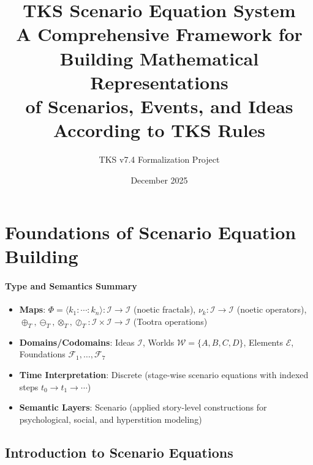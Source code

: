 \documentclass[11pt,twoside]{book}
\newcommand{\noe}[1]{\nu_{#1}}
\newcommand{\Ideas}{\mathcal{I}}
\newcommand{\Worlds}{\mathcal{W}}
\newcommand{\Elements}{\mathcal{E}}
\newcommand{\Foundations}{\mathcal{F}}
\newcommand{\Frac}{\Phi}
\newcommand{\Tadd}{\oplus_T}
\newcommand{\Tsub}{\ominus_T}
\newcommand{\Tmul}{\otimes_T}
\newcommand{\Tdiv}{\oslash_T}
\begin{document}
\title{\textbf{TKS Scenario Equation System} \\[0.5em]
\Large A Comprehensive Framework for Building Mathematical Representations \\
of Scenarios, Events, and Ideas According to TKS Rules}
\author{TKS v7.4 Formalization Project}
\date{December 2025}
\maketitle

\tableofcontents

\part{Foundations of Scenario Equation Building}

\subsection*{Type and Semantics Summary}
\begin{itemize}
    \item \textbf{Maps}: $\Frac = \langle k_1 : \cdots : k_n \rangle : \Ideas \to \Ideas$ (noetic fractals), $\noe{k} : \Ideas \to \Ideas$ (noetic operators), $\Tadd, \Tsub, \Tmul, \Tdiv : \Ideas \times \Ideas \to \Ideas$ (Tootra operations)
    \item \textbf{Domains/Codomains}: Ideas $\Ideas$, Worlds $\Worlds = \{A, B, C, D\}$, Elements $\Elements$, Foundations $\Foundations_1, \ldots, \Foundations_7$
    \item \textbf{Time Interpretation}: Discrete (stage-wise scenario equations with indexed steps $t_0 \to t_1 \to \cdots$)
    \item \textbf{Semantic Layers}: Scenario (applied story-level constructions for psychological, social, and hyperstition modeling)
\end{itemize}

\chapter{Introduction to Scenario Equations}
\label{ch:intro-scenario}
\end{document}
